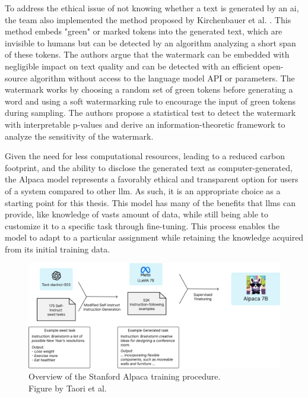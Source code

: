     
    To address the ethical issue of not knowing whether a text is generated by an \gls{ai}, the team also implemented the method proposed by Kirchenbauer et al. \cite{kirchenbauerWatermarkLargeLanguage2023}. This method embeds "green" or marked tokens into the generated text, which are invisible to humans but can be detected by an algorithm analyzing a short span of these tokens.  
    The authors argue that the watermark can be embedded with negligible impact on text quality and can be detected with an efficient open-source algorithm without access to the language model API or parameters. The watermark works by choosing a random set of green tokens before generating a word and using a soft watermarking rule to encourage the input of green tokens during sampling. The authors propose a statistical test to detect the watermark with interpretable p-values and derive an information-theoretic framework to analyze the sensitivity of the watermark.

    Given the need for less computational resources, leading to a reduced carbon footprint, and the ability to disclose the generated text as computer-generated, the Alpaca model represents a favorably ethical and transparent option for users of a system compared to other \gls{llm}. As such, it is an appropriate choice as a starting point for this thesis. This model has many of the benefits that \glspl{llm} can provide, like knowledge of vasts amount of data, while still being able to customize it to a specific task through fine-tuning. This process enables the model to adapt to a particular assignment while retaining the knowledge acquired from its initial training data.

    
    \begin{figure}[htb]
        \centerline{
        \includegraphics[width=17cm]{images/alpaca_framework.jpeg}}
        \caption[Overview of the Stanford Alpaca training procedure.]{Overview of the Stanford Alpaca training procedure.\\Figure by Taori et al. \cite{taoriStanfordCRFM}}
        \label{fig:alpaca_training}
    \end{figure}